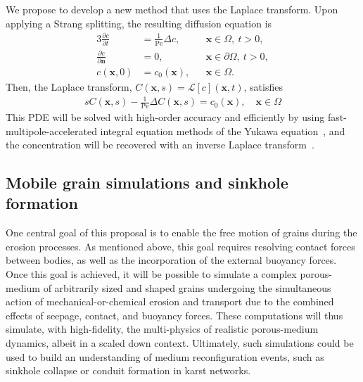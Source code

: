 \documentclass[11pt]{article}
\newcommand{\pd}[2]{ \frac{ \partial #1}{ \partial #2 } }
\newcommand{\bvec}[1]{{\mathbf{#1}}}
\newcommand{\Pe}{\mathrm{Pe}}
\newcommand{\xx}{\bvec{x}}
\newcommand{\nn}{{\mathbf{n}}}
\begin{document}
We propose to develop a new method that uses the Laplace transform.
Upon applying a Strang splitting, the resulting diffusion equation is
\begin{alignat}{3}
  \pd{c}{t} &= \frac{1}{\Pe} \Delta c, \quad &&\xx \in \Omega, \: t>0, \\
  \pd{c}{\nn} &= 0, &&\xx \in \partial\Omega, \: t>0, \\
  c(\xx,0) &= c_0(\xx), &&\xx \in \Omega.
\end{alignat}
Then, the Laplace transform, $C(\xx,s) = \mathcal{L}[c](\xx,t)$,
satisfies
\begin{align}
  sC(\xx,s) - \frac{1}{\Pe}\Delta C(\xx,s) = c_0(\xx), 
    \quad \xx \in \Omega
\end{align}
This PDE will be solved with high-order accuracy and efficiently by
using fast-multipole-accelerated integral equation methods of the Yukawa
equation~\cite{kro-qua2011}, and the concentration will be recovered
with an inverse Laplace transform~\cite{jos-war2006}.





\subsection{Mobile grain simulations and sinkhole formation}


	One central goal of this proposal is to enable the free motion of grains during the erosion processes. As mentioned above, this goal requires resolving contact forces between bodies, as well as the incorporation of the external buoyancy forces. Once this goal is achieved, it will be possible to simulate a complex porous-medium of arbitrarily sized and shaped grains undergoing the simultaneous action of mechanical-or-chemical erosion and transport due to the combined effects of seepage, contact, and buoyancy forces. These computations will thus simulate, with high-fidelity, the multi-physics of realistic porous-medium dynamics, albeit in a scaled down context. Ultimately, such simulations could be used to build an understanding of medium reconfiguration events, such as sinkhole collapse or conduit formation in karst networks.
\end{document}
